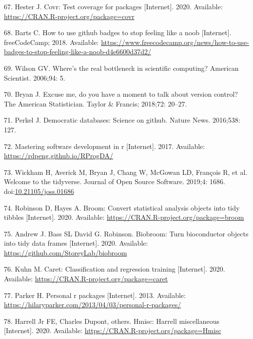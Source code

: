 \documentclass[10pt,letterpaper]{article}
\begin{document}
\leavevmode\hypertarget{ref-covr}{}%
67. Hester J. Covr: Test coverage for packages {[}Internet{]}. 2020.
Available: \url{https://CRAN.R-project.org/package=covr}

\leavevmode\hypertarget{ref-barts2018}{}%
68. Barts C. How to use github badges to stop feeling like a noob
{[}Internet{]}. freeCodeCamp; 2018. Available:
\url{https://www.freecodecamp.org/news/how-to-use-badges-to-stop-feeling-like-a-noob-d4e6600d37d2/}

\leavevmode\hypertarget{ref-wilson2006}{}%
69. Wilson GV. Where's the real bottleneck in scientific computing?
American Scientist. 2006;94: 5.

\leavevmode\hypertarget{ref-bryan2018}{}%
70. Bryan J. Excuse me, do you have a moment to talk about version
control? The American Statistician. Taylor \& Francis; 2018;72: 20--27.

\leavevmode\hypertarget{ref-perkel2016}{}%
71. Perkel J. Democratic databases: Science on github. Nature News.
2016;538: 127.

\leavevmode\hypertarget{ref-peng2017}{}%
72. Mastering software development in r {[}Internet{]}. 2017. Available:
\url{https://rdpeng.github.io/RProgDA/}

\leavevmode\hypertarget{ref-tidyverse}{}%
73. Wickham H, Averick M, Bryan J, Chang W, McGowan LD, François R, et
al. Welcome to the tidyverse. Journal of Open Source Software. 2019;4:
1686.
doi:\href{https://doi.org/10.21105/joss.01686}{10.21105/joss.01686}

\leavevmode\hypertarget{ref-broom}{}%
74. Robinson D, Hayes A. Broom: Convert statistical analysis objects
into tidy tibbles {[}Internet{]}. 2020. Available:
\url{https://CRAN.R-project.org/package=broom}

\leavevmode\hypertarget{ref-biobroom}{}%
75. Andrew J. Bass SL David G. Robinson. Biobroom: Turn bioconductor
objects into tidy data frames {[}Internet{]}. 2020. Available:
\url{https://github.com/StoreyLab/biobroom}

\leavevmode\hypertarget{ref-caret}{}%
76. Kuhn M. Caret: Classification and regression training
{[}Internet{]}. 2020. Available:
\url{https://CRAN.R-project.org/package=caret}

\leavevmode\hypertarget{ref-parker2013}{}%
77. Parker H. Personal r packages {[}Internet{]}. 2013. Available:
\url{https://hilaryparker.com/2013/04/03/personal-r-packages/}

\leavevmode\hypertarget{ref-Hmisc}{}%
78. Harrell Jr FE, Charles Dupont, others. Hmisc: Harrell miscellaneous
{[}Internet{]}. 2020. Available:
\url{https://CRAN.R-project.org/package=Hmisc}
\end{document}
